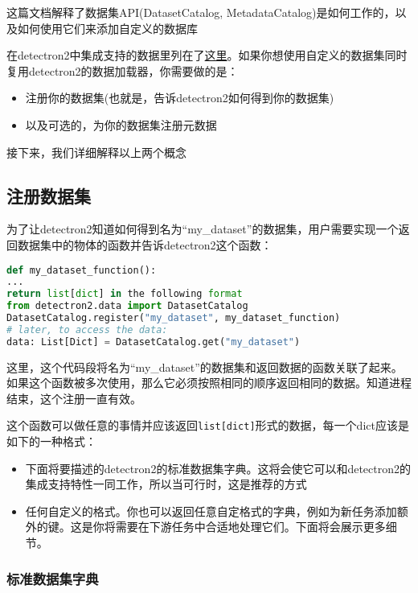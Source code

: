 \documentclass[../main.tex]{subfile}
\begin{document}
这篇文档解释了数据集API(DatasetCatalog, MetadataCatalog)是如何工作的，以及如何使用它们来添加自定义的数据库

在detectron2中集成支持的数据里列在了\href{https://detectron2.readthedocs.io/en/latest/tutorials/builtin_datasets.html}{这里}。如果你想使用自定义的数据集同时复用detectron2的数据加载器，你需要做的是：
\begin{itemize}
    \item 注册你的数据集(也就是，告诉detectron2如何得到你的数据集)
    \item 以及可选的，为你的数据集注册元数据
\end{itemize}
接下来，我们详细解释以上两个概念

\subsection{注册数据集}

为了让detectron2知道如何得到名为“my\_dataset”的数据集，用户需要实现一个返回数据集中的物体的函数并告诉detectron2这个函数：

\begin{lstlisting}[language=Python]
def my_dataset_function():
...
return list[dict] in the following format
from detectron2.data import DatasetCatalog
DatasetCatalog.register("my_dataset", my_dataset_function)
# later, to access the data:
data: List[Dict] = DatasetCatalog.get("my_dataset")
\end{lstlisting}

这里，这个代码段将名为“my\_dataset”的数据集和返回数据的函数关联了起来。如果这个函数被多次使用，那么它必须按照相同的顺序返回相同的数据。知道进程结束，这个注册一直有效。

这个函数可以做任意的事情并应该返回\lstinline{list[dict]}形式的数据，每一个dict应该是如下的一种格式：

\begin{itemize}
    \item 下面将要描述的detectron2的标准数据集字典。这将会使它可以和detectron2的集成支持特性一同工作，所以当可行时，这是推荐的方式
    \item 任何自定义的格式。你也可以返回任意自定格式的字典，例如为新任务添加额外的键。这是你将需要在下游任务中合适地处理它们。下面将会展示更多细节。
\end{itemize}

\subsubsection{标准数据集字典}
\end{document}
